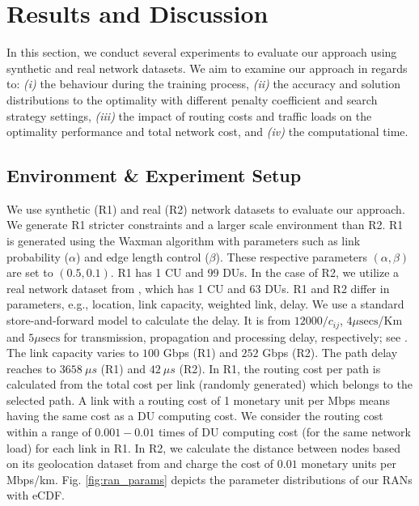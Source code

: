 

\section{Results and Discussion} \label{sec:results}
\vspace{-1mm}
In this section, we conduct several experiments to evaluate our approach using synthetic and real network datasets. We aim to examine our approach in regards to: \textit{(i)} the behaviour during the training process, \textit{(ii)} the accuracy and solution distributions to the optimality with different penalty coefficient and search strategy settings, \textit{(iii)} the impact of routing costs and traffic loads on the optimality performance and total network cost, and \textit{(iv)} the computational time.




\vspace{-2mm}
\subsection{Environment \& Experiment Setup}
We use synthetic (R1) and real (R2) network datasets to evaluate our approach. We generate R1  stricter constraints and a larger scale environment than R2. R1 is generated using the Waxman algorithm \cite{waxman} with parameters such as link probability ($\alpha$) and edge length control ($\beta$). These respective parameters $(\alpha,\beta)$ are set to $(0.5, 0.1)$. R1 has 1 CU and 99 DUs. In the case of R2, we utilize a real network dataset from \cite{network_sndb}, which has 1 CU and 63 DUs.  R1 and R2 differ in parameters, e.g., location, link capacity, weighted link, delay. We use  a standard store-and-forward model to calculate the delay. It is from $12000/c_{ij}$, $4 \mu\text{secs}$/Km and $5 \mu\text{secs}$ for transmission, propagation and processing delay, respectively; see \cite{vranmec_andres}. The link capacity varies to $100$ Gbps (R1) and $252$ Gbps (R2). The path delay reaches to $3658 \ \mu s$ (R1) and $42 \ \mu s$ (R2). In R1, the routing cost per path is calculated from the total cost per link (randomly generated) which belongs to the selected path. A link with a routing cost of 1 monetary unit per Mbps means having the same cost as a DU computing cost. We consider the routing cost within a range of $0.001 - 0.01$ times of DU computing cost (for the same network load) for each link in R1. In R2, we calculate the distance between nodes based on its geolocation dataset from \cite{network_sndb} and charge the cost of $0.01$ monetary units per Mbps/km. Fig. \ref{fig:ran_params} depicts the parameter distributions of our RANs with eCDF.

